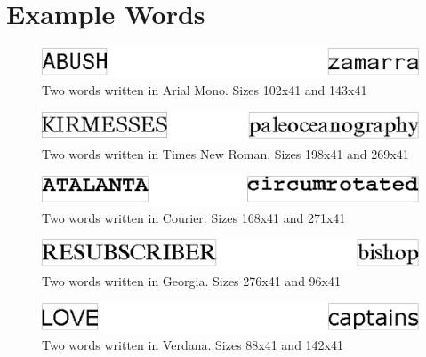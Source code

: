 
\chapter{Example Words}
\label{ch:example_words}
\begin{figure}[H]
    \centering
    \captionsetup{justification=centering}
    \includegraphics[width=1\textwidth]{fig/appendix_b/arial.png}
    \caption{Two words written in Arial Mono. Sizes 102x41 and 143x41}
\end{figure}

\begin{figure}[H]
    \centering
    \captionsetup{justification=centering}
    \includegraphics[width=1\textwidth]{fig/appendix_b/timesnewroman.png}
    \caption{Two words written in Times New Roman. Sizes 198x41 and 269x41}
\end{figure}

\begin{figure}[H]
    \centering
    \captionsetup{justification=centering}
    \includegraphics[width=1\textwidth]{fig/appendix_b/courier.png}
    \caption{Two words written in Courier. Sizes 168x41 and 271x41}
\end{figure}

\begin{figure}[H]
    \centering
    \captionsetup{justification=centering}
    \includegraphics[width=1\textwidth]{fig/appendix_b/georgia.png}
    \caption{Two words written in Georgia. Sizes 276x41 and 96x41}
\end{figure}

\begin{figure}[H]
    \centering
    \captionsetup{justification=centering}
    \includegraphics[width=1\textwidth]{fig/appendix_b/verdana.png}
    \caption{Two words written in Verdana. Sizes 88x41 and 142x41}
\end{figure}